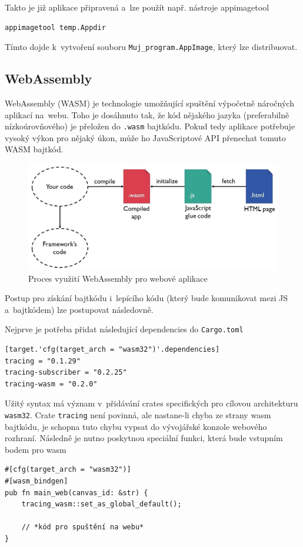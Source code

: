 \documentclass[a4paper, 12pt]{article} %
\begin{document}
		Takto je již aplikace připravená a~lze použít např. nástroje appimagetool\cite{appimagetool}
		\begin{verbatim}
appimagetool temp.Appdir
		\end{verbatim}

		Tímto dojde k~vytvoření souboru \texttt{Muj\_program.AppImage}, který lze distribuovat.


	\subsection{WebAssembly}
		WebAssembly (WASM) je technologie umožňující spuštění výpočetně náročných aplikací na~webu. Toho je dosáhnuto tak, že kód nějakého jazyka (preferabilně nízkoúrovňového) je přeložen do \texttt{.wasm} bajtkódu. Pokud tedy aplikace potřebuje vysoký výkon pro nějaký úkon, může ho JavaScriptové API přenechat tomuto WASM bajtkód.\cite{wasm}
		
		\begin{center}
			\begin{figure}[H]
				\centering
				\includegraphics[width=13cm]{wasm}
				\caption{Proces využití WebAssembly pro webové aplikace \cite{wasm_fig}}
				\label{fig:wasm}
			\end{figure}
		\end{center}
		
		Postup pro získání bajtkódu i~lepícího kódu (který bude komunikovat mezi JS a~bajtkódem) lze postupovat následovně.
		
		Nejprve je potřeba přidat následující dependencies do \texttt{Cargo.toml}
		\begin{verbatim}
[target.'cfg(target_arch = "wasm32")'.dependencies]
tracing = "0.1.29"
tracing-subscriber = "0.2.25"
tracing-wasm = "0.2.0"
		\end{verbatim}
		
		Užitý syntax má význam v~přidávání crates specifických pro cílovou architekturu \texttt{wasm32}. Crate \texttt{tracing} není povinná, ale nastane-li chyba ze strany wasm bajtkódu, je schopna tuto chybu vypsat do vývojářské konzole webového rozhraní. Následně je nutno poskytnou speciální funkci, která bude vstupním bodem pro wasm
		\begin{verbatim}
#[cfg(target_arch = "wasm32")]
#[wasm_bindgen]
pub fn main_web(canvas_id: &str) {
	tracing_wasm::set_as_global_default();

	// *kód pro spuštění na webu*
}
		\end{verbatim}
		
\end{document}
